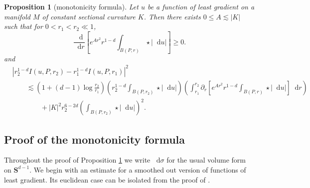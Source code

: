 \documentclass[reqno,11pt]{amsart}
\newcommand{\Sph}{\mathbf S}
\newcommand*\dif{\mathop{}\!\mathrm{d}}
\newtheorem{proposition}[theorem]{Proposition}
\theoremstyle{definition}
\numberwithin{equation}{section}
\begin{document}
\begin{proposition}[monotonicity formula]\label{Monotone}
Let $u$ be a function of least gradient on a manifold $M$ of constant sectional curvature $K$.
Then there exists $0 \leq A \lesssim |K|$ such that for $0 < r_1 < r_2 \ll 1$,
\begin{equation}\label{weak monotonicity}
\frac{\dif}{\dif r}\left[e^{Ar^2}r^{1 - d} \int_{B(P, r)} \star |\dif u|\right] \geq 0.
\end{equation}
and
\begin{align*}
&|r_2^{1 - d} I(u, P, r_2) - r_1^{1 - d} I(u, P, r_1)|^2 \\
&\qquad \lesssim \left(1 + (d - 1) \log \frac{r_2}{r_1}\right) \left(r_2^{1 - d}\int_{B(P, r_2)} \star |\dif u| \right)
\left(\int_{r_1}^{r_2} \partial_r \left[e^{Ar^2} r^{1 - d} \int_{B(P, r)} \star |\dif u|\right] \dif r\right)\\
&\qquad \qquad + |K|^2 r_2^{6-2d} \left(\int_{B(P, r_2)} \star |\dif u|\right)^2.
\end{align*}
\end{proposition}

\subsection{Proof of the monotonicity formula}
Throughout the proof of Proposition \ref{Monotone} we write $\dif \sigma$ for the usual volume form on $\Sph^{d - 1}$.
We begin with an estimate for a smoothed out version of functions of least gradient.
Its euclidean case can be isolated from the proof of \cite[Lemma 5.8]{Giusti77}.
\end{document}
